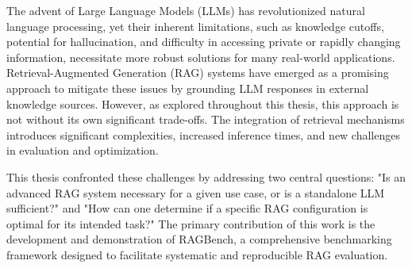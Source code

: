 
The advent of Large Language Models (LLMs) has revolutionized natural language processing, yet their inherent limitations, such as knowledge cutoffs, potential for hallucination, and difficulty in accessing private or rapidly changing information, necessitate more robust solutions for many real-world applications. Retrieval-Augmented Generation (RAG) systems have emerged as a promising approach to mitigate these issues by grounding LLM responses in external knowledge sources. However, as explored throughout this thesis, this approach is not without its own significant trade-offs. The integration of retrieval mechanisms introduces significant complexities, increased inference times, and new challenges in evaluation and optimization.

This thesis confronted these challenges by addressing two central questions: "Is an advanced RAG system necessary for a given use case, or is a standalone LLM sufficient?" and "How can one determine if a specific RAG configuration is optimal for its intended task?" The primary contribution of this work is the development and demonstration of RAGBench, a comprehensive benchmarking framework designed to facilitate systematic and reproducible RAG evaluation.

